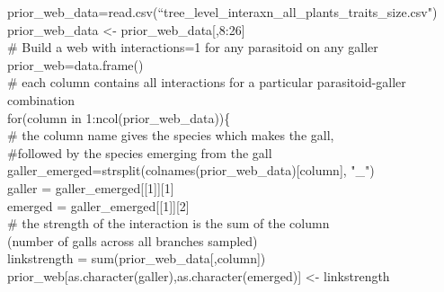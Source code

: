 \documentclass[12pt]{article}
\begin{document}
      \vspace{12pt}
      \begin{em}
      \noindent \hspace{2pt}prior\_web\_data=read.csv(``tree\_level\_interaxn\_all\_plants\_traits\_size.csv")\\
      \noindent \hspace{2pt}prior\_web\_data \textless- prior\_web\_data[,8:26]\\
      \vspace{4pt}
      \noindent \hspace{2pt}\# Build a web with interactions=1 for any parasitoid on any galler\\
      \noindent \hspace{2pt}prior\_web=data.frame()\\
      \vspace{4pt}
      \noindent \hspace{2pt}\# each column contains all interactions for a \noindent \hspace{2pt}particular parasitoid-galler combination\\
      \noindent \hspace{2pt}for(column in 1:ncol(prior\_web\_data))\{\\
      \hspace{4pt}\# the column name gives the species which makes the gall,\\
      \hspace{4pt}\#followed by the species emerging from the gall\\
      \hspace{4pt}galler\_emerged=strsplit(colnames(prior\_web\_data)[column], "\_")\\
      \hspace{4pt}galler = galler\_emerged[[1]][1]\\
      \hspace{4pt}emerged = galler\_emerged[[1]][2]\\
      \vspace{4pt}
      \hspace{4pt}\# the strength of the interaction is the sum of the column\\
      \hspace{4pt}(number of galls across all branches sampled)\\
      \hspace{4pt}linkstrength = sum(prior\_web\_data[,column])\\
      \hspace{4pt}prior\_web[as.character(galler),as.character(emerged)] \textless- linkstrength\\

\end{em}
\end{document}
